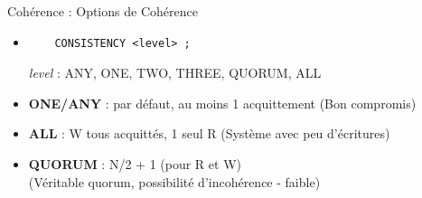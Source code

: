\begin{frame}[fragile]{Cohérence : Options de Cohérence}
\begin{itemize}
	\item 	\begin{verbatim}
	CONSISTENCY <level> ;
	\end{verbatim}
	\textit{level} : \footnotesize \textsc{ANY, ONE, TWO, THREE, QUORUM, ALL}\normalsize
	\item \textbf{\textsc{ONE/ANY}} : par défaut, au moins 1 acquittement	\footnotesize (Bon compromis)\normalsize
	\item \textbf{\textsc{ALL}} : W tous acquittés, 1 seul R \footnotesize (Système avec peu d'écritures)\normalsize
	\item \textbf{\textsc{QUORUM}} : N/2 + 1 (pour R et W) \\\footnotesize (Véritable quorum, possibilité d'incohérence - faible)\normalsize
	
\end{itemize}
\end{frame}